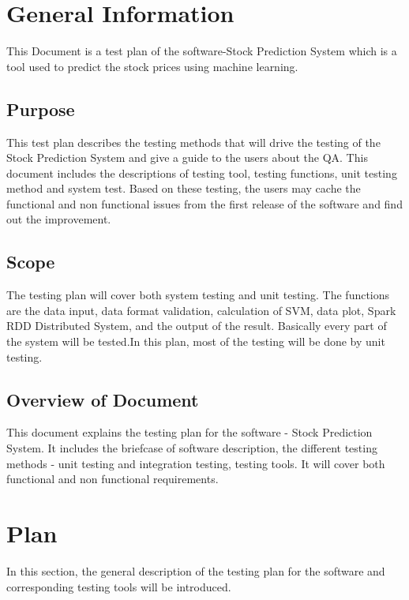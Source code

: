 \documentclass[12pt, titlepage]{article}
\begin{document}
\section{General Information}
This Document is a test plan of the software-Stock Prediction System which is a tool used to predict the stock prices using machine learning. 


\subsection{Purpose}

This test plan describes the testing methods that will drive the testing of the
Stock Prediction System and give a guide to the users about the QA. This
document includes the descriptions of testing tool, testing functions, unit
testing method and system test. Based on these testing, the users may cache the
functional and non functional issues from the first release of the software and
find out the improvement.

\subsection{Scope}

The testing plan will cover both system testing and unit testing. The functions
are the data input, data format validation, calculation of SVM, data plot, Spark
RDD Distributed System, and the output of the result. Basically every part of
the system will be tested.In  this plan, most of the testing
will be done by unit testing.




\subsection{Overview of Document}
This document explains the testing plan for the software - Stock Prediction
System. It includes the briefcase of software description, the different testing
methods - unit testing and integration testing, testing tools. It will cover
both functional and non functional requirements.
\section{Plan}
In this section, the general description of the testing plan for the software and corresponding testing tools will be introduced.
\end{document}
